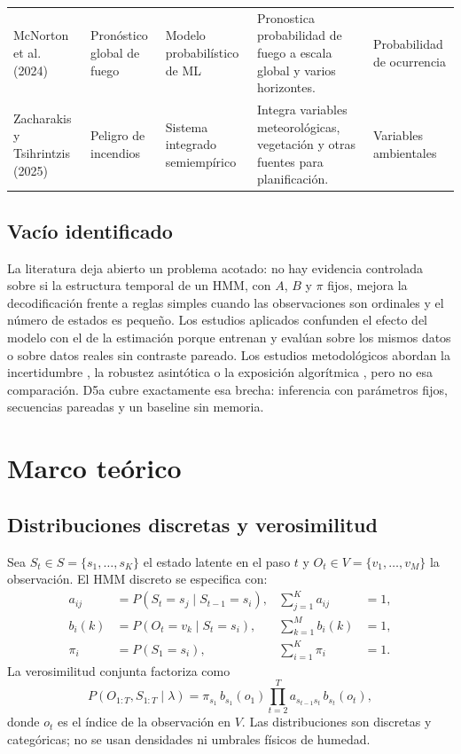 \documentclass[11pt,letterpaper]{article}
\begin{document}
\begin{table}[H]
\begin{tabularx}{\textwidth}{@{}p{2.5cm}p{2.1cm}X X p{2.5cm}@{}}
McNorton et al. (2024) & Pronóstico global de fuego & Modelo probabilístico de ML & Pronostica probabilidad de fuego a escala global y varios horizontes. & Probabilidad de ocurrencia\\
Zacharakis y Tsihrintzis (2025) & Peligro de incendios & Sistema integrado semiempírico & Integra variables meteorológicas, vegetación y otras fuentes para planificación. & Variables ambientales\\
\bottomrule
\end{tabularx}
\end{table}

\subsection{Vacío identificado}

La literatura deja abierto un problema acotado: no hay evidencia controlada sobre si la estructura temporal de un HMM, con \(A\), \(B\) y \(\pi\) fijos, mejora la decodificación frente a reglas simples cuando las observaciones son ordinales y el número de estados es pequeño. Los estudios aplicados confunden el efecto del modelo con el de la estimación porque entrenan y evalúan sobre los mismos datos o sobre datos reales sin contraste pareado. Los estudios metodológicos abordan la incertidumbre \cite{nicosia2026}, la robustez asintótica \cite{pouzo2025} o la exposición algorítmica \cite{rabiner1989,baum1970}, pero no esa comparación. D5a cubre exactamente esa brecha: inferencia con parámetros fijos, secuencias pareadas y un baseline sin memoria.

\section{Marco teórico}

\subsection{Distribuciones discretas y verosimilitud}

Sea \(S_t\in S=\{s_1,\dots,s_K\}\) el estado latente en el paso \(t\) y \(O_t\in V=\{v_1,\dots,v_M\}\) la observación. El HMM discreto se especifica con:
\begin{align}
a_{ij} &= P(S_t=s_j\mid S_{t-1}=s_i), & \sum_{j=1}^{K}a_{ij}&=1,\\
b_i(k) &= P(O_t=v_k\mid S_t=s_i), & \sum_{k=1}^{M}b_i(k)&=1,\\
\pi_i &= P(S_1=s_i), & \sum_{i=1}^{K}\pi_i&=1.
\end{align}
La verosimilitud conjunta factoriza como
\begin{equation}
P(O_{1:T},S_{1:T}\mid\lambda)
=\pi_{s_1}\,b_{s_1}(o_1)\prod_{t=2}^{T}a_{s_{t-1}s_t}\,b_{s_t}(o_t),
\end{equation}
donde \(o_t\) es el índice de la observación en \(V\). Las distribuciones son discretas y categóricas; no se usan densidades ni umbrales físicos de humedad.
\end{document}
